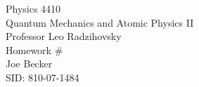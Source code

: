 \begin{titlepage}
\setlength{\topmargin}{1.5in}
\begin{center}
\Huge{Physics 4410} \\
\LARGE{Quantum Mechanics and Atomic Physics II} \\
\Large{Professor Leo Radzihovsky} \\[1cm]

\huge{Homework \#\HWnum}\\[0.5cm]

\large{Joe Becker} \\
\large{SID: 810-07-1484} \\
\large{\due} 

\end{center}

\end{titlepage}


